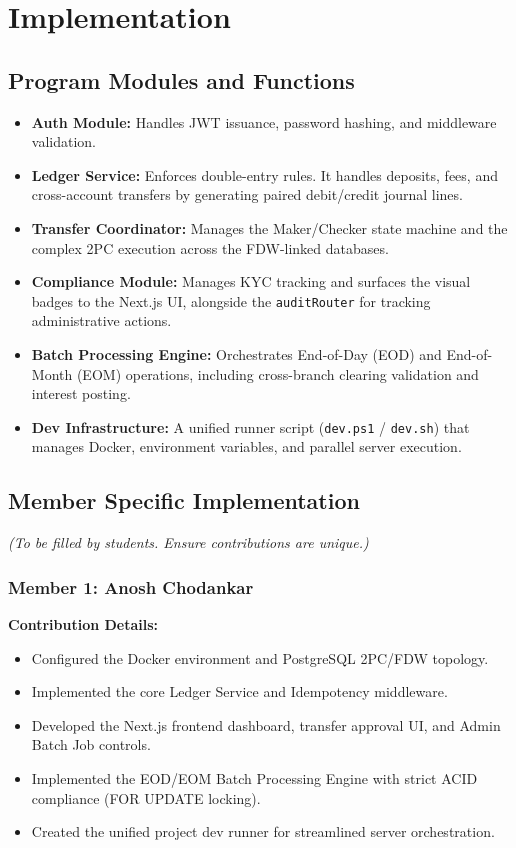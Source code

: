 \chapter{Implementation}

\section{Program Modules and Functions}
\begin{itemize}
    \item \textbf{Auth Module:} Handles JWT issuance, password hashing, and middleware validation.
    \item \textbf{Ledger Service:} Enforces double-entry rules. It handles deposits, fees, and cross-account transfers by generating paired debit/credit journal lines.
    \item \textbf{Transfer Coordinator:} Manages the Maker/Checker state machine and the complex 2PC execution across the FDW-linked databases.
    \item \textbf{Compliance Module:} Manages KYC tracking and surfaces the visual badges to the Next.js UI, alongside the \texttt{auditRouter} for tracking administrative actions.
    \item \textbf{Batch Processing Engine:} Orchestrates End-of-Day (EOD) and End-of-Month (EOM) operations, including cross-branch clearing validation and interest posting.
    \item \textbf{Dev Infrastructure:} A unified runner script (\texttt{dev.ps1} / \texttt{dev.sh}) that manages Docker, environment variables, and parallel server execution.
\end{itemize}

\section{Member Specific Implementation}
\textit{(To be filled by students. Ensure contributions are unique.)}

\subsection{Member 1: Anosh Chodankar}
\textbf{Contribution Details:} 
\begin{itemize}
    \item Configured the Docker environment and PostgreSQL 2PC/FDW topology.
    \item Implemented the core Ledger Service and Idempotency middleware.
    \item Developed the Next.js frontend dashboard, transfer approval UI, and Admin Batch Job controls.
    \item Implemented the EOD/EOM Batch Processing Engine with strict ACID compliance (FOR UPDATE locking).
    \item Created the unified project dev runner for streamlined server orchestration.
\end{itemize}


